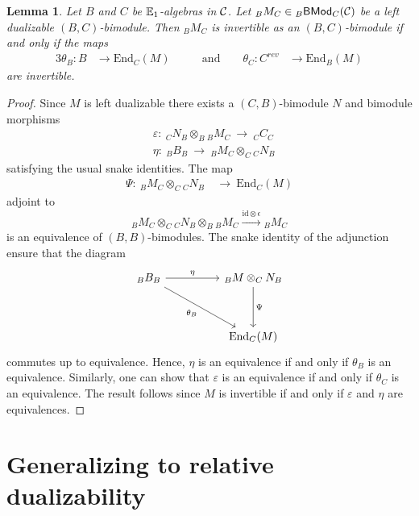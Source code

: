 \documentclass[10pt, reqno, twoside
, final
]{amsart}
\numberwithin{equation}{subsection}%
\theoremstyle{definition}
\theoremstyle{definition}
\theoremstyle{definition}
\theoremstyle{definition}
\theoremstyle{definition}
\theoremstyle{definition}
\theoremstyle{definition}
\theoremstyle{definition}
\theoremstyle{definition}
\theoremstyle{plain}
\theoremstyle{definition}
\theoremstyle{plain}
\theoremstyle{definition}
\theoremstyle{plain}
\theoremstyle{definition}
\theoremstyle{definition}
\theoremstyle{plain}
\newtheorem{lem}[defn]{Lemma}
\theoremstyle{plain}
\theoremstyle{definition}
\theoremstyle{plain}
\theoremstyle{plain}
\theoremstyle{plain}
\begin{document}
\begin{lem}\label{lem:invert-bimod-cond}
Let $B$ and $C$ be $\mathbb{E}_1$-algebras in $\mathcal{C}$. Let $_{B}M_C \in {}_B\mathsf{BMod}_C(\mathcal{C})$ be a left dualizable $(B,C)$-bimodule. Then $_{B}M_C$ is invertible as an $(B,C)$-bimodule if and only if the maps
\begin{alignat*}{3}
    \theta_{B} : B &\longrightarrow \mathrm{End}_{C}(M) \qquad &\text{and} \qquad  \theta_{C}: C^{rev} &\longrightarrow \mathrm{End}_{B}(M)
\end{alignat*}
are invertible.
\end{lem}

\begin{proof}
Since $M$ is left dualizable there exists a $(C,B)$-bimodule $N$ and bimodule morphisms
\begin{align*}
    &\varepsilon  : \ {}_{C}N_B \otimes_{B} {}_BM_{C} \ \longrightarrow \  {}_{C}C_{C} \\
    &\eta : \  {}_{B}B_{B} \ \longrightarrow \  {}_{B} M_C \otimes_C {}_CN_{B} 
\end{align*}
satisfying the usual snake identities. The map
\begin{align*}
    \Psi : \  {}_{B}M_C \otimes_C {}_CN_B \ &\longrightarrow \ \mathrm{End}_{C}(M)
\end{align*}
adjoint to 
\[  {}_BM_C\otimes_C {}_CN_B \otimes_B {}_BM_C \xrightarrow{\mathrm{id}\otimes \epsilon} {}_BM_C  \]
is an equivalence of $(B,B)$-bimodules. The snake identity of the adjunction ensure that the diagram 
\begin{equation*}
    \begin{tikzcd}
	{{}_{B}B_{B}} && {{}_{B}M \otimes_{C} N_B} \\
	\\
	&& {\mathrm{End}_{C}(M)}
	\arrow["\eta", from=1-1, to=1-3]
	\arrow["{\theta_{B}}"', from=1-1, to=3-3]
	\arrow["\Psi", from=1-3, to=3-3]
\end{tikzcd}
\end{equation*}
commutes up to equivalence. Hence, $\eta$ is an equivalence if and only if $\theta_B$ is an equivalence. Similarly, one can show that $\varepsilon$ is an equivalence if and only if $\theta_{C}$ is an equivalence. The result follows since $M$ is invertible if and only if $\varepsilon$ and $\eta$ are equivalences.
\end{proof}




\section{Generalizing to relative dualizability}\label{sec:relative}
\end{document}
